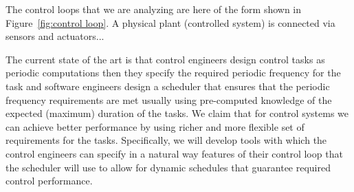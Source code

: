 \documentclass[11pt]{article}
\begin{document}
%	

The control loops that we are analyzing are here of the form shown in Figure~\ref{fig:control loop}. A physical plant (controlled system) is connected via sensors and actuators... %

The current state of the art is that control engineers design control tasks as periodic computations then they specify the required periodic frequency for the task and software engineers design a scheduler that ensures that the periodic frequency requirements are met usually using pre-computed knowledge of the expected (maximum) duration of the tasks.
We claim that for control systems we can achieve better performance by using richer and more flexible set of requirements for the tasks. Specifically, we will develop tools with which the control engineers can specify in a natural way features of their control loop that the scheduler will use to allow for dynamic schedules that guarantee required control performance. 


\end{document}
